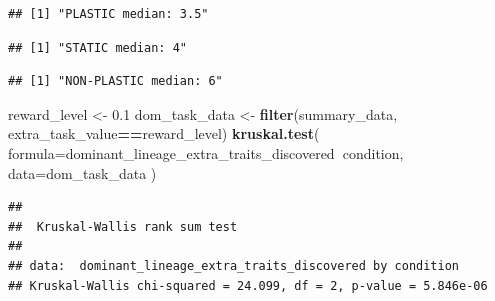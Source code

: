 \documentclass[]{book}
\newenvironment{Shaded}{\begin{snugshade}}{\end{snugshade}}
\newcommand{\DataTypeTok}[1]{\textcolor[rgb]{0.13,0.29,0.53}{#1}}
\newcommand{\FloatTok}[1]{\textcolor[rgb]{0.00,0.00,0.81}{#1}}
\newcommand{\KeywordTok}[1]{\textcolor[rgb]{0.13,0.29,0.53}{\textbf{#1}}}
\newcommand{\NormalTok}[1]{#1}
\newcommand{\OperatorTok}[1]{\textcolor[rgb]{0.81,0.36,0.00}{\textbf{#1}}}
\newcommand{\StringTok}[1]{\textcolor[rgb]{0.31,0.60,0.02}{#1}}
\begin{document}
\begin{verbatim}
## [1] "PLASTIC median: 3.5"
\end{verbatim}

\begin{Shaded}
\end{Shaded}

\begin{verbatim}
## [1] "STATIC median: 4"
\end{verbatim}

\begin{Shaded}
\end{Shaded}

\begin{verbatim}
## [1] "NON-PLASTIC median: 6"
\end{verbatim}

\begin{Shaded}
\begin{Highlighting}[]
\NormalTok{reward_level <-}\StringTok{ }\FloatTok{0.1}
\NormalTok{dom_task_data <-}\StringTok{ }\KeywordTok{filter}\NormalTok{(summary_data, extra_task_value}\OperatorTok{==}\NormalTok{reward_level)}
\KeywordTok{kruskal.test}\NormalTok{(}
  \DataTypeTok{formula=}\NormalTok{dominant_lineage_extra_traits_discovered}\OperatorTok{~}\NormalTok{condition,}
  \DataTypeTok{data=}\NormalTok{dom_task_data}
\NormalTok{)}
\end{Highlighting}
\end{Shaded}

\begin{verbatim}
## 
##  Kruskal-Wallis rank sum test
## 
## data:  dominant_lineage_extra_traits_discovered by condition
## Kruskal-Wallis chi-squared = 24.099, df = 2, p-value = 5.846e-06
\end{verbatim}
\end{document}
